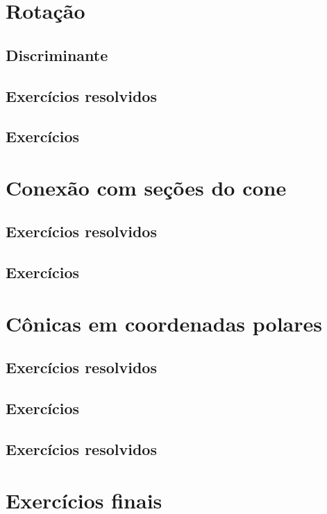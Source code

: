 \construirExer

\section{Rotação}
\construirSec

\subsection{Discriminante}
\construirSec

\subsection*{Exercícios resolvidos}
\construirExeresol

\subsection*{Exercícios}
\construirExer


\section{Conexão com seções do cone}
\construirSec

\subsection*{Exercícios resolvidos}
\construirExeresol


\subsection*{Exercícios}
\construirExer

\section{Cônicas em coordenadas polares}
\construirSec


\subsection*{Exercícios resolvidos}
\construirExeresol


\subsection*{Exercícios}
\construirExer


\subsection*{Exercícios resolvidos}
\construirExeresol

\section{Exercícios finais}
\construirExer


